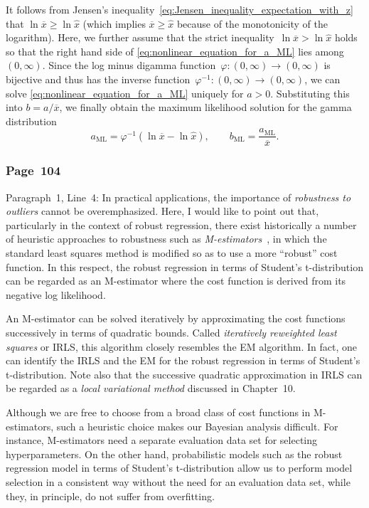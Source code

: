 \documentclass[12pt,a4paper]{article}
\newcommand{\erratum}[1]{%
\subsubsection*{#1}
\addcontentsline{toc}{subsection}{#1}}
\begin{document}
It follows from Jensen's inequality~\eqref{eq:Jensen_inequality_expectation_with_z}
that $\ln \overline{x} \geqslant \ln \widehat{x}$
(which implies $\overline{x} \geqslant \widehat{x}$ because of the monotonicity of the logarithm).
Here, we further assume that the strict inequality~$\ln \overline{x} > \ln \widehat{x}$ holds
so that the right hand side of \eqref{eq:nonlinear_equation_for_a_ML} lies
among $(0, \infty)$.
Since the log minus digamma function~$\varphi: (0, \infty) \to (0, \infty)$ is bijective
and thus has the inverse function~$\varphi^{-1}: (0, \infty) \to (0, \infty)$,
we can solve \eqref{eq:nonlinear_equation_for_a_ML} uniquely for $a > 0$.
Substituting this into $b = a/\overline{x}$,
we finally obtain the maximum likelihood solution for the gamma distribution
\begin{equation}
a_{\text{ML}} = \varphi^{-1}\left( \ln\overline{x} - \ln\widehat{x} \right), \qquad
b_{\text{ML}} = \frac{a_{\text{ML}}}{\overline{x}} .
\end{equation}


\erratum{Page~104}
Paragraph~1, Line~4:
In practical applications, the importance of
\emph{robustness to outliers} cannot be overemphasized.
Here, I would like to point out that,
particularly in the context of robust regression,
there exist historically a number of heuristic approaches to robustness such as
\emph{M-estimators}~\citep{Press:NR,Szeliski:ComputerVision},
in which the standard least squares method is modified so as to use
a more ``robust'' cost function.
In this respect, the robust regression in terms of Student's t-distribution can be regarded as
an M-estimator where the cost function is derived from its negative log likelihood.

An M-estimator can be solved iteratively by approximating the cost functions successively
in terms of quadratic bounds.
Called \emph{iteratively reweighted least squares} or IRLS,
this algorithm closely resembles the EM algorithm.
In fact, one can identify the IRLS and the EM for
the robust regression in terms of Student's t-distribution.
Note also that the successive quadratic approximation in IRLS can be regarded as
a \emph{local variational method} discussed in Chapter~10.

Although we are free to choose from a broad class of cost functions in M-estimators,
such a heuristic choice makes our Bayesian analysis difficult.
For instance, M-estimators need a separate evaluation data set for selecting hyperparameters.
On the other hand, probabilistic models such as
the robust regression model in terms of Student's t-distribution
allow us to perform model selection
in a consistent way without the need for an evaluation data set,
while they, in principle, do not suffer from overfitting.
\end{document}
